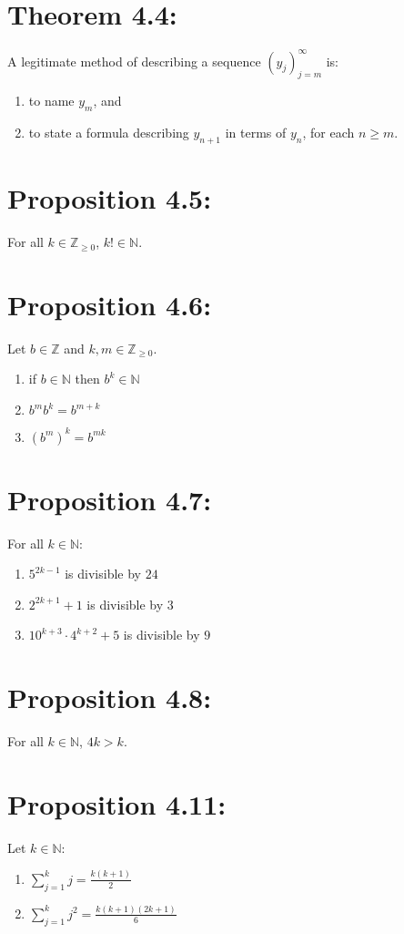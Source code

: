 \section*{Theorem 4.4:}
A legitimate method of describing a sequence $(y_j)_{j=m}^{\infty}$ is:
\begin{enumerate}
    \item to name $y_m$, and
    \item to state a formula describing $y_{n+1}$ in terms of $y_n$, for each $n \geq m$.
\end{enumerate}

\section*{Proposition 4.5:}
For all $k \in \mathbb{Z}_{\geq 0}$, $k! \in \mathbb{N}$.

\section*{Proposition 4.6:}
Let $b \in \mathbb{Z}$ and $k,m \in \mathbb{Z}_{\geq 0}$.
\begin{enumerate}
    \item if $b \in \mathbb{N}$ then $b^k \in \mathbb{N}$
    \item $b^mb^k = b^{m+k}$
    \item $(b^m)^k = b^{mk}$
\end{enumerate}

\section*{Proposition 4.7:}
For all $k \in \mathbb{N}$:
\begin{enumerate}
    \item $5^{2k-1}$ is divisible by $24$
    \item $2^{2k+1} + 1$ is divisible by $3$
    \item $10^{k+3} \cdot 4^{k+2} + 5$ is divisible by $9$
\end{enumerate}

\section*{Proposition 4.8:}
For all $k \in \mathbb{N}$, $4k > k$.

\section*{Proposition 4.11:}
Let $k \in \mathbb{N}$:
\begin{enumerate}
    \item $\sum_{j=1}^k j = \frac{k(k+1)}{2}$
    \item $\sum_{j=1}^k j^2 = \frac{k(k+1)(2k+1)}{6}$
\end{enumerate}

